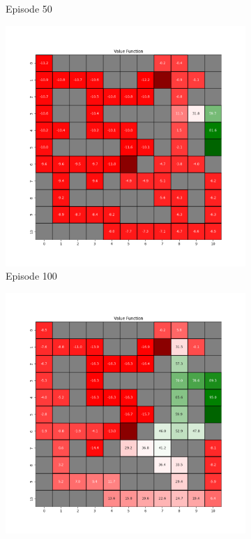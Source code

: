 \documentclass{assignment}
\begin{document}
\begin{figure}[H]
\begin{subfigure}{0.3\textwidth}
    \caption{Episode 50}
    \end{subfigure}\hfill
    \begin{subfigure}{0.3\textwidth}
        \includegraphics[width=\textwidth]{figures/value_q/default/value_function_alpha_0.1_gamma_0.95_epsilon_0.2_iteration_100.png}
    \caption{Episode 100}
    \end{subfigure}
    \begin{subfigure}{0.3\textwidth}
        \includegraphics[width=\textwidth]{figures/value_q/default/value_function_alpha_0.1_gamma_0.95_epsilon_0.2_iteration_1000.png}

\end{subfigure}
\end{figure}
\end{document}
